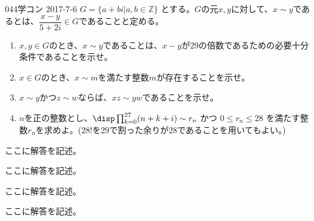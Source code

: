 \begin{thm}{044}{}{学コン 2017-7-6}
 $G=\{a+bi | a, b \in\mathbb{Z}\}$ とする。$G$の元$x,y$に対して、$x\sim y$であるとは、$\dfrac{x-y}{5+2i}\in G$であることと定める。
 \begin{enumerate}
  \item $x, y\in G$のとき、$x\sim y$であることは、$x-y$が29の倍数であるための必要十分条件であることを示せ。
  \item $x\in G$のとき、$x\sim m$を満たす整数$m$が存在することを示せ。
  \item $x\sim y$かつ$z\sim w$ならば、$xz\sim yw$であることを示せ。
  \item $n$を正の整数とし、$\disp \prod_{k=0}^{27} (n+k+i) \sim r_n$ かつ $0\le r_n \le 28$ を満たす整数$r_n$を求めよ。($28!$を29で割った余りが28であることを用いてもよい。)
 \end{enumerate}
\end{thm}

ここに解答を記述。

ここに解答を記述。

ここに解答を記述。

ここに解答を記述。